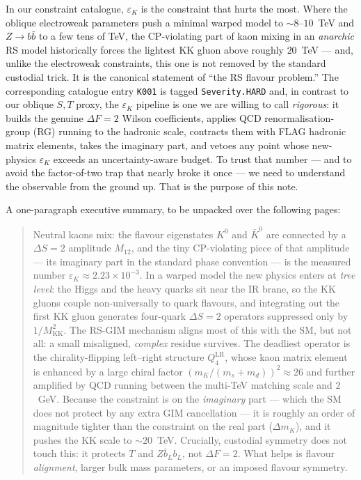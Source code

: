\documentclass[11pt]{article}
\newcommand{\MKK}{M_{\mathrm{KK}}}
\newcommand{\epsK}{\varepsilon_K}
\newcommand{\Mtwelve}{M_{12}}
\newcommand{\dmk}{\Delta m_K}
\newcommand{\QLRfour}{Q_4^{\mathrm{LR}}}
\newcommand{\code}[1]{\texttt{#1}}
\theoremstyle{definition}
\begin{document}
In our constraint catalogue, $\epsK$ is the constraint that hurts the most.
Where the oblique electroweak parameters push a minimal warped model to
$\sim 8$--$10$~TeV and $Z\to b\bar b$ to a few tens of TeV, the CP-violating
part of kaon mixing in an \emph{anarchic} RS model historically forces the
lightest KK gluon above roughly $20$~TeV --- and, unlike the electroweak
constraints, this one is not removed by the standard custodial trick. It is the
canonical statement of ``the RS flavour problem.'' The corresponding catalogue
entry \code{K001} is tagged \code{Severity.HARD} and, in contrast to our oblique
$S,T$ proxy, the $\epsK$ pipeline is one we are willing to call
\emph{rigorous}: it builds the genuine $\Delta F=2$ Wilson coefficients, applies
QCD renormalisation-group (RG) running to the hadronic scale, contracts them with
FLAG hadronic matrix elements, takes the imaginary part, and vetoes any point
whose new-physics $\epsK$ exceeds an uncertainty-aware budget. To trust that
number --- and to avoid the factor-of-two trap that nearly broke it once --- we
need to understand the observable from the ground up. That is the purpose of this
note.

A one-paragraph executive summary, to be unpacked over the following pages:

\begin{quote}
\small
Neutral kaons mix: the flavour eigenstates $K^0$ and $\bar K^0$ are connected by
a $\Delta S=2$ amplitude $\Mtwelve$, and the tiny CP-violating piece of that
amplitude --- its imaginary part in the standard phase convention --- is the
measured number $\epsK \approx 2.23\times10^{-3}$. In a warped model the new
physics enters at \emph{tree level}: the Higgs and the heavy quarks sit near the
IR brane, so the KK gluons couple non-universally to quark flavours, and
integrating out the first KK gluon generates four-quark $\Delta S=2$ operators
suppressed only by $1/\MKK^2$. The RS-GIM mechanism aligns most of this with the
SM, but not all: a small misaligned, \emph{complex} residue survives. The
deadliest operator is the chirality-flipping left--right structure $\QLRfour$,
whose kaon matrix element is enhanced by a large chiral factor
$(m_K/(m_s+m_d))^2\approx26$ and further amplified by QCD running between the multi-TeV
matching scale and $2$~GeV. Because the constraint is on the \emph{imaginary}
part --- which the SM does not protect by any extra GIM cancellation --- it is
roughly an order of magnitude tighter than the constraint on the real part
($\dmk$), and it pushes the KK scale to $\sim 20$~TeV. Crucially, custodial
symmetry does not touch this: it protects $T$ and $Z\bar b_L b_L$, not $\Delta
F=2$. What helps is flavour \emph{alignment}, larger bulk mass parameters, or an
imposed flavour symmetry.
\end{quote}
\end{document}
